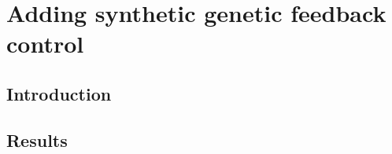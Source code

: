 \documentclass[../main.tex]{subfiles}
\begin{document}
\chapter{Adding synthetic genetic feedback control}
\label{chapter6}
\section{Introduction}
\label{chapter6:introduction}

\section{Results}
\label{chapter6:results}
\end{document}

